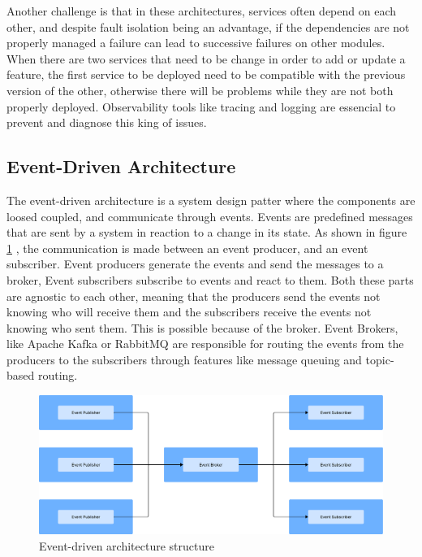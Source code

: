 Another challenge is that in these architectures, services often depend on each other,
and despite fault isolation being an advantage, if the dependencies are not
properly managed a failure can lead to successive failures on other modules.
When there are two services that need to be change in order to add or update
a feature, the first service to be deployed need to be compatible with the
previous version of the other, otherwise there will be problems while they
are not both properly deployed.
Observability tools like tracing and logging are essencial to prevent and
diagnose this king of issues\cite{richards2015software}.

\subsection{Event-Driven Architecture}
The event-driven architecture is a system design patter where the components
are loosed coupled, and communicate through events. Events are predefined
messages that are sent by a system in reaction to a change in its state.
As shown in figure \ref{fig:architectures:event-driven}
, the communication is made between an event producer, and an event subscriber.
Event producers generate the events and send the messages to a broker, Event
subscribers subscribe to events and react to them. Both these parts are agnostic
to each other, meaning that the producers send the events not knowing who will
receive them and the subscribers receive the events not knowing who sent them.
This is possible because of the broker. Event Brokers, like Apache Kafka or
RabbitMQ are responsible for routing the events from the producers to the
subscribers through features like message queuing and topic-based routing\cite{9226286,manchana2021event,AWSEventDriven}.

\begin{figure}[htbp]
	\centering
	\includegraphics[width=\textwidth, height=0.5\textheight, keepaspectratio]{Chapters/Figures/Architectures/Event-driven.pdf}
	\caption{Event-driven architecture structure}
	\label{fig:architectures:event-driven}
\end{figure}

